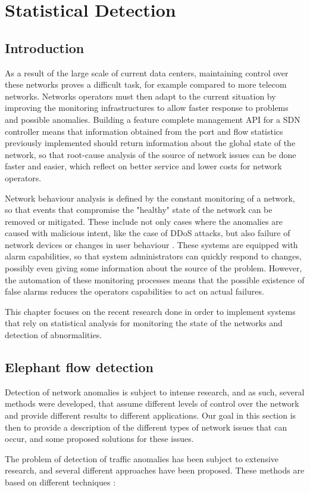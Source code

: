\chapter{Statistical Detection} \label{chap:stat_det} %

\section {Introduction}

As a result of the large scale of current data centers, maintaining control over these networks proves a difficult task, for example compared to more telecom networks. Networks operators must then adapt to the current situation
by improving the monitoring infrastructures to allow faster response to problems and possible anomalies.  Building a feature complete management API for a SDN controller means that information obtained from the port and 
flow statistics previously implemented should return information about the global state of the network, so that root-cause analysis of the source of network issues can be done faster and easier,
 which reflect on better service and lower costs for network operators. 
\par Network behaviour analysis is defined by the constant monitoring of a network, so that events that compromise the "healthy" state of the network can be removed or mitigated. These include not only cases where the anomalies are
caused with malicious intent, like the case of DDoS attacks, but also failure of network devices or changes in user behaviour \cite {traffic_anomaly_control_charts}. These systems are equipped with alarm capabilities, so that 
system administrators can quickly respond to changes, possibly even giving some information about the source of the problem. However, the automation of these monitoring processes means that the possible existence
of false alarms reduces the operators capabilities to act on actual failures. 
\par This chapter focuses on the recent research done in order to implement systems that rely on statistical analysis for monitoring the state of the networks and detection of abnormalities.

\section {Elephant flow detection}

Detection of network anomalies is subject to intense research, and as such, several methods were developed, that assume different levels of control over the network and provide different results to different applications. Our goal
in this section is then to provide a description of the different types of network issues that can occur, and some proposed solutions for these issues.
\par The problem of detection of traffic anomalies has been subject to extensive research, and several different approaches have been proposed. These methods are based on different techniques 
\cite {http://shiftleft.com/mirrors/www.hpl.hp.com/personal/Praveen_Yalagandula/papers/INFOCOM11.pdf}:

